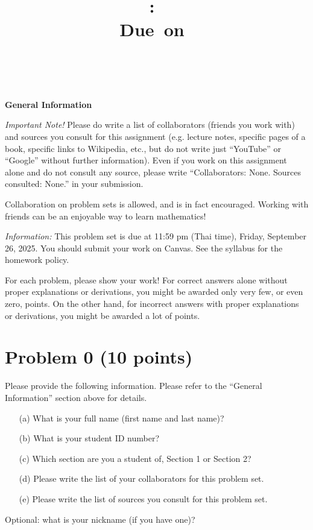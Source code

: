 \documentclass{article}
\title{
    \vspace{2in}
    \textmd{\textbf{\hmwkClass:\ \hmwkTitle}}\\
    \normalsize\vspace{0.1in}\small{Due\ on\ \hmwkDueDate}\\
    \vspace{0.1in}\large{\textit{\hmwkClassInstructor\ \hmwkClassTime}}
    \vspace{3in}
}
\author{\hmwkAuthorName}
\date{}
\theoremstyle{remark}
\begin{document}
\maketitle
\newpage

\textbf{General Information}

\medskip

\textit{Important Note!} Please do write a list of collaborators (friends you work with) and sources you
consult for this assignment (e.g. lecture notes, specific pages of a book, specific links to Wikipedia,
etc., but do not write just ``YouTube'' or ``Google'' without further information). Even if you
work on this assignment alone and do not consult any source, please write ``Collaborators: None.
Sources consulted: None.'' in your submission.

Collaboration on problem sets is allowed, and is in fact encouraged. Working with friends can be
an enjoyable way to learn mathematics!

\textit{Information:} This problem set is due at 11{:}59 pm (Thai time), Friday, September 26, 2025.
You should submit your work on Canvas. See the syllabus for the homework policy.

For each problem, please show your work! For correct answers alone without proper explanations
or derivations, you might be awarded only very few, or even zero, points. On the other hand, for
incorrect answers with proper explanations or derivations, you might be awarded a lot of points.

\pagebreak

\section*{Problem 0 (10 points)}

Please provide the following information. Please refer to the ``General Information'' section above
for details.
\begin{enumerate}
    \item[(a)] What is your full name (first name and last name)?
    \item[(b)] What is your student ID number?
    \item[(c)] Which section are you a student of, Section 1 or Section 2?
    \item[(d)] Please write the list of your collaborators for this problem set.
    \item[(e)] Please write the list of sources you consult for this problem set.
\end{enumerate}
Optional: what is your nickname (if you have one)?
\end{document}
